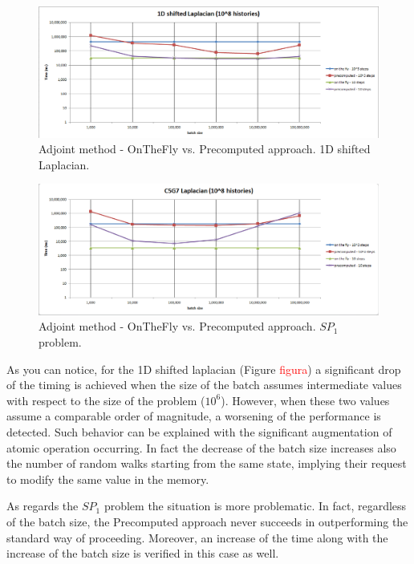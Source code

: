 \documentclass[a4paper,10pt]{article}
\begin{document}
\begin{figure}[h!]
  \centering
    \includegraphics[width=\textwidth]{1d_lap_onthefly_vs_precompute.png}
    \caption{Adjoint method - OnTheFly vs. Precomputed approach. 1D shifted 
Laplacian.}
\label{1d_lap}
\end{figure}

\begin{figure}[h!]
  \centering
    \includegraphics[width=\textwidth]{c5g7_onthefly_vs_precompute.png}
    \caption{Adjoint method - OnTheFly vs. Precomputed approach. $SP_1$ 
problem.}
\label{1d_lap}
\end{figure}

As you can notice, for the 1D shifted laplacian (Figure 
\textcolor{red}{figura}) a significant drop of the timing is achieved when the 
size of the batch assumes intermediate values with respect to the size of the 
problem ($10^6$). However, when these two values assume a comparable order of 
magnitude, a worsening of the performance is detected. Such behavior can be 
explained with the significant augmentation of atomic operation occurring. In 
fact the decrease of the batch size increases also the number of random walks 
starting from the same state, implying their request to modify the same value in 
the memory. 

As regards the $SP_1$ problem the situation is more problematic. In fact, 
regardless of the batch size, the Precomputed approach never succeeds in 
outperforming the standard way of proceeding. Moreover, an increase of the time 
along with the increase of the batch size is verified in this case as well. 
\newline
\end{document}
